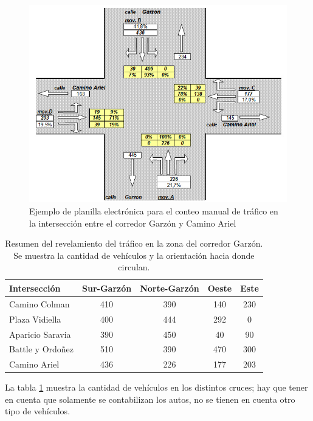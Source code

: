 \begin{figure}[H]
	\centering
	\includegraphics[width=0.9\linewidth]{Figures/conteo_hoja}
	\caption[Ejemplo de planilla electrónica para el conteo manual de tráfico.]{Ejemplo de planilla electrónica para el conteo manual de tráfico en la intersección entre el corredor Garzón y Camino Ariel}
	\label{fig:conteo_hoja}
\end{figure}



\begin{table}[H]
	\renewcommand{\arraystretch}{1.2}
	\caption[Resumen del revelamiento del tráfico en la zona del corredor Garzón.]{Resumen del revelamiento del tráfico en la zona del corredor Garzón. Se muestra la cantidad de vehículos y la orientación hacia donde circulan.}
	\label{table:resumen_trafico}
	\centering
	\begin{tabular}{lcccc}
		\hline
		Intersección&
		Sur-Garzón& 
		Norte-Garzón & 
		Oeste &
		Este 
		\\ 
		\hline
		Camino Colman  & 410 & 390 & 140 & 230\\		
		Plaza Vidiella  & 400 & 444 & 292 & 0\\		
		Aparicio Saravia  & 390 & 450 & 40 & 90\\		
		Battle y Ordoñez  & 510 & 390 & 470 & 300 \\	
		Camino Ariel  & 436 & 226 & 177 & 203 \\													
		\hline
		
		
		\hline
	\end{tabular}
\end{table}

La tabla \ref{table:resumen_trafico} muestra la cantidad de vehículos en los distintos cruces; hay que tener en cuenta que solamente se contabilizan los autos, no se tienen en cuenta otro tipo de vehículos.

